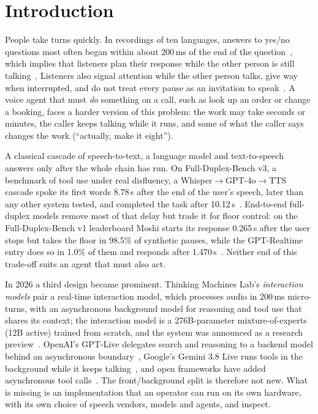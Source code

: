 \section{Introduction}\label{sec:intro}

People take turns quickly. In recordings of ten languages, answers to yes/no questions most often began
within about 200\,ms of the end of the question~\citep{stivers2009universals}, which implies that
listeners plan their response while the other person is still talking~\citep{levinson2015timing}.
Listeners also signal attention while the other person talks, give way when interrupted, and do not
treat every pause as an invitation to speak~\citep{sacks1974turntaking,skantze2021review}. A voice agent
that must \emph{do} something on a call, such as look up an order or change a booking, faces a harder
version of this problem: the work may take seconds or minutes, the caller keeps talking while it runs,
and some of what the caller says changes the work (``actually, make it eight'').

A classical cascade of speech-to-text, a language model and text-to-speech answers only after the whole
chain has run. On Full-Duplex-Bench v3, a benchmark of tool use under real disfluency, a
Whisper$\to$GPT-4o$\to$TTS cascade spoke its first words 8.78\,s after the end of the user's speech, later
than any other system tested, and completed the task after 10.12\,s~\citep{lin2026fdbv3}. End-to-end full-duplex models remove most of that delay but
trade it for floor control: on the Full-Duplex-Bench v1 leaderboard Moshi starts its response 0.265\,s
after the user stops but takes the floor in 98.5\% of synthetic pauses, while the GPT-Realtime entry does
so in 1.0\% of them and responds after 1.470\,s~\citep{fdb_repo,lin2025fdbv1}. Neither end of this
trade-off suits an agent that must also act.

In 2026 a third design became prominent. Thinking Machines Lab's \emph{interaction models} pair a
real-time interaction model, which processes audio in 200\,ms micro-turns, with an asynchronous background
model for reasoning and tool use that shares its context; the interaction model is a 276B-parameter
mixture-of-experts (12B active) trained from scratch, and the system was announced as a research
preview~\citep{tml2026interaction}. OpenAI's GPT-Live
delegates search and reasoning to a backend model behind an asynchronous
boundary~\citep{openai2026gptlive,openai2026gptlivesys}, Google's Gemini 3.8 Live runs tools in the
background while it keeps talking~\citep{google2026g38}, and open frameworks have added asynchronous tool
calls~\citep{livekit2026async,pipecat_fc}. The front/background split is therefore not new. What is
missing is an implementation that an operator can run on its own hardware, with its own choice of speech
vendors, models and agents, and inspect.

